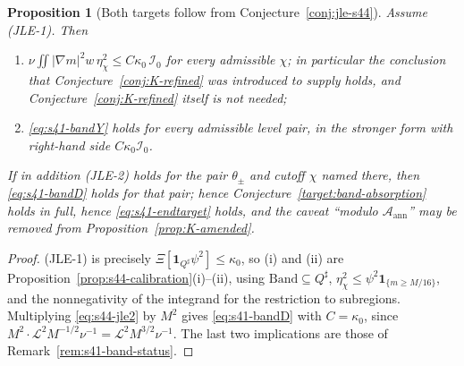 \documentclass[11pt]{article}
\newtheorem{proposition}[theorem]{Proposition}
\theoremstyle{definition}
\theoremstyle{remark}
\begin{document}
\begin{proposition}[Both targets follow from
  Conjecture~\ref{conj:jle-s44}]\label{prop:s44-jle-implies}
  Assume \textup{(JLE-1)}. Then
  \begin{enumerate}[label=(\roman*)]
    \item $\nu\iint|\nabla m|^2w\,\eta_\chi^2\leq C\kappa_0\,\mathcal{I}_0$
      for every admissible $\chi$; in particular the conclusion that
      Conjecture~\ref{conj:K-refined} was introduced to supply holds, and
      Conjecture~\ref{conj:K-refined} itself is not needed;
    \item \eqref{eq:s41-bandY} holds for every admissible level pair, in the
      stronger form with right-hand side $C\kappa_0\mathcal{I}_0$.
  \end{enumerate}
  If in addition \textup{(JLE-2)} holds for the pair $\theta_\pm$ and cutoff
  $\chi$ named there, then \eqref{eq:s41-bandD} holds for that pair; hence
  Conjecture~\ref{target:band-absorption} holds in full, hence
  \eqref{eq:s41-endtarget} holds, and the caveat ``modulo
  $\mathcal{A}_{\mathrm{ann}}$'' may be removed from
  Proposition~\ref{prop:K-amended}.
\end{proposition}
\begin{proof}
  \textup{(JLE-1)} is precisely $\Xi[\mathbf{1}_{Q^\sharp}\psi^2]\leq\kappa_0$,
  so (i) and (ii) are Proposition~\ref{prop:s44-calibration}(i)--(ii), using
  $\mathrm{Band}\subseteq Q^\sharp$,
  $\eta_\chi^2\leq\psi^2\mathbf{1}_{\{m\geq M/16\}}$, and the nonnegativity of
  the integrand for the restriction to subregions. Multiplying
  \eqref{eq:s44-jle2} by $M^2$ gives \eqref{eq:s41-bandD} with $C=\kappa_0$,
  since $M^2\cdot\mathcal{L}^2M^{-1/2}\nu^{-1}=\mathcal{L}^2M^{3/2}\nu^{-1}$.
  The last two implications are those of
  Remark~\ref{rem:s41-band-status}.
\end{proof}
\end{document}
